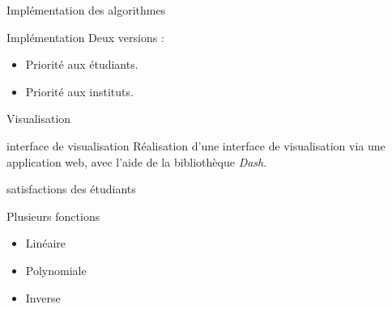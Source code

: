 \documentclass[10pt,handout]{beamer}
\begin{document}
\begin{frame}{Implémentation des algorithmes}
    \begin{block}{Implémentation}
        Deux versions : 
        \begin{itemize}
            \item Priorité aux étudiants.
            \item Priorité aux instituts.
        \end{itemize}
    \end{block}

\end{frame}

\begin{frame}{Visualisation}
    \begin{block}{interface de visualisation}
        Réalisation d'une interface de visualisation via une application web, avec l'aide de la bibliothèque \textit{Dash}.
    \end{block}
\end{frame}

\begin{frame}{satisfactions des étudiants}
    \begin{block}{Plusieurs fonctions}
        \begin{itemize}
            \item Linéaire
            \item Polynomiale
            \item Inverse
        \end{itemize}
    \end{block}
    
\end{frame}
\end{document}

